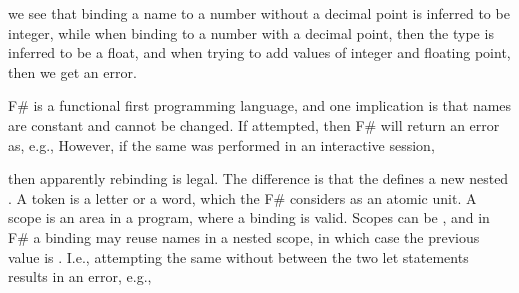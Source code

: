




%
we see that binding a name to a number without a decimal point is inferred to be integer, while when binding to a number with a decimal point, then the type is inferred to be a float, and when trying to add values of integer and floating point, then we get an error.

F\# is a functional first programming language, and one implication is that names are constant and cannot be changed. If attempted, then F\# will return an error as, e.g., 
%
%
However, if the same was performed in an interactive session,
%



%
then apparently rebinding is legal. The difference is that the \idx{\token{;;}}  defines a new nested . A token is a letter or a word, which the F\# considers as an atomic unit. A scope is an area in a program, where a binding is valid. Scopes can be , and in F\# a binding may reuse names in a nested scope, in which case the previous value is . I.e., attempting the same without \token{;;} between the two let statements results in an error, e.g.,
%


